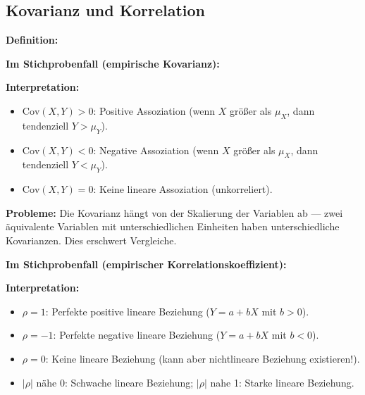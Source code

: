 \newpage

\subsection{Kovarianz und Korrelation}


\textbf{Definition:}

\textbf{Im Stichprobenfall (empirische Kovarianz):}

\textbf{Interpretation:}
\begin{itemize}[leftmargin=1.5em]
    \item $\text{Cov}(X, Y) > 0$: Positive Assoziation (wenn $X$ größer als $\mu_X$, dann tendenziell $Y > \mu_Y$).
    \item $\text{Cov}(X, Y) < 0$: Negative Assoziation (wenn $X$ größer als $\mu_X$, dann tendenziell $Y < \mu_Y$).
    \item $\text{Cov}(X, Y) = 0$: Keine lineare Assoziation (unkorreliert).
\end{itemize}

\textbf{Probleme:} Die Kovarianz hängt von der Skalierung der Variablen ab — zwei äquivalente Variablen mit unterschiedlichen Einheiten haben unterschiedliche Kovarianzen. Dies erschwert Vergleiche.



\textbf{Im Stichprobenfall (empirischer Korrelationskoeffizient):}

\textbf{Interpretation:}
\begin{itemize}[leftmargin=1.5em]
    \item $\rho = 1$: Perfekte positive lineare Beziehung ($Y = a + bX$ mit $b > 0$).
    \item $\rho = -1$: Perfekte negative lineare Beziehung ($Y = a + bX$ mit $b < 0$).
    \item $\rho = 0$: Keine lineare Beziehung (kann aber nichtlineare Beziehung existieren!).
    \item $|\rho|$ nähe 0: Schwache lineare Beziehung; $|\rho|$ nahe 1: Starke lineare Beziehung.
\end{itemize}


